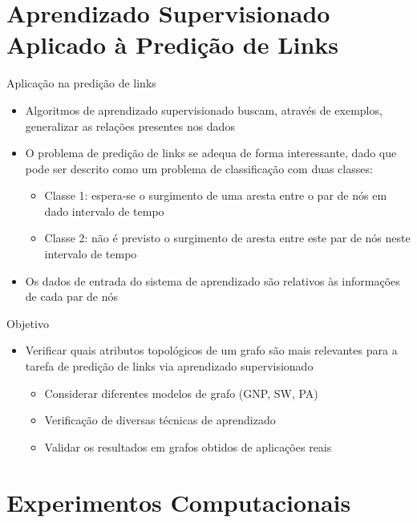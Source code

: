 \documentclass{beamer}
\begin{document}
\section{Aprendizado Supervisionado Aplicado à Predição de Links}

\begin{frame}{Aplicação na predição de links}
	\begin{itemize}
		\item Algoritmos de aprendizado supervisionado buscam, através de exemplos, generalizar as relações presentes nos dados
		\item O problema de predição de links se adequa de forma interessante, dado que pode ser descrito como um problema de classificação com duas classes:
		\begin{itemize}
			\item Classe 1: espera-se o surgimento de uma aresta entre o par de nós em dado intervalo de tempo
			\item Classe 2: não é previsto o surgimento de aresta entre este par de nós neste intervalo de tempo
		\end{itemize}		
		\item Os dados de entrada do sistema de aprendizado são relativos às informações de cada par de nós
	\end{itemize}
\end{frame}


\begin{frame}{Objetivo}
	\begin{itemize}
		\item Verificar quais atributos topológicos de um grafo são mais relevantes para a tarefa de predição de links via aprendizado supervisionado
		\begin{itemize}
			\item Considerar diferentes modelos de grafo (GNP, SW, PA)
			\item Verificação de diversas técnicas de aprendizado
			\item Validar os resultados em grafos obtidos de aplicações reais
		\end{itemize}
	\end{itemize}
\end{frame}


\section{Experimentos Computacionais}
\end{document}
